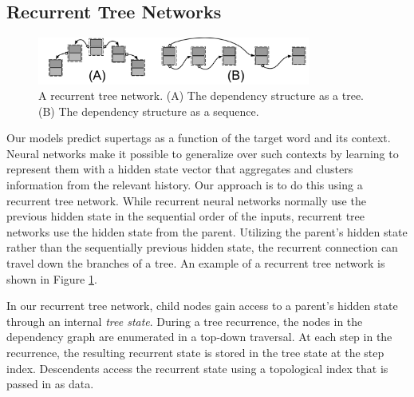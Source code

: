\documentclass[11pt]{article}
\begin{document}
\subsection{Recurrent Tree Networks}
\label{subsec:rtn}

\begin{figure}[tH!]
\centering
\includegraphics[width=0.8\textwidth]{rtn2.pdf}
\caption{A recurrent tree network. (A) The dependency structure as a tree.  (B) The dependency structure as a sequence.}
 \label{fig:rtn}
\end{figure}

Our models predict supertags as a function of the target word and its
context.  Neural networks make it possible to generalize over such
contexts by learning to represent them with a hidden state vector that
aggregates and clusters information from the relevant history.  Our
approach is to do this using a recurrent tree network.
%
While recurrent neural networks normally use the previous hidden state in the sequential order of the inputs,
recurrent tree networks use the hidden state from the parent.
%
Utilizing the parent's hidden state rather than the sequentially previous hidden
state, the recurrent connection can travel down the branches of a tree.
%
An example of a recurrent tree network is shown in Figure \ref{fig:rtn}.



In our recurrent tree network, child nodes gain access to a parent's hidden state
through an internal \emph{tree state}.
%
During a tree recurrence, the nodes in the dependency graph are enumerated in a
top-down traversal.
%
At each step in the recurrence, the resulting recurrent state is stored in the
tree state at the step index.
%
Descendents access the recurrent state using a topological index that is passed in as data.
\end{document}
